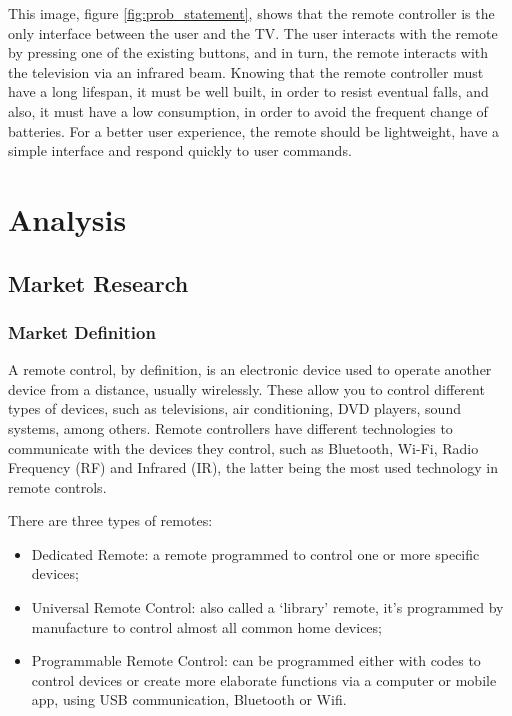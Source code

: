 \documentclass[12pt, letterpaper]{report}
\begin{document}
This image, figure \ref{fig:prob_statement}, shows that the remote controller is the only interface between the user and the TV. The user interacts with the remote by pressing one of the existing buttons, and in turn, the remote interacts with the television via an infrared beam. Knowing that the remote controller must have a long lifespan, it must be well built, in order to resist eventual falls, and also, it must have a low consumption, in order to avoid the frequent change of batteries. For a better user experience, the remote should be lightweight, have a simple interface and respond quickly to user commands.

\chapter{Analysis}
\section{Market Research}
\subsection{Market Definition}
A remote control, by definition, is an electronic device used to operate another device from a distance, usually wirelessly. These allow you to control different types of devices, such as televisions, air conditioning, DVD players, sound systems, among others. Remote controllers have different technologies to communicate with the devices they control, such as Bluetooth, Wi-Fi, Radio Frequency (RF) and Infrared (IR), the latter being the most used technology in remote controls.

There are three types of remotes:

\begin{itemize}
	\item Dedicated Remote: a remote programmed to control one or more 					specific devices; 

	\item Universal Remote Control: also called a ‘library’ remote, it’s 				programmed by manufacture to control almost all common home devices;

	\item Programmable Remote Control: can be programmed either with codes 				to control devices or create more elaborate functions via a 					computer or mobile app, using USB communication, Bluetooth or Wifi.
\end{itemize}
\end{document}
